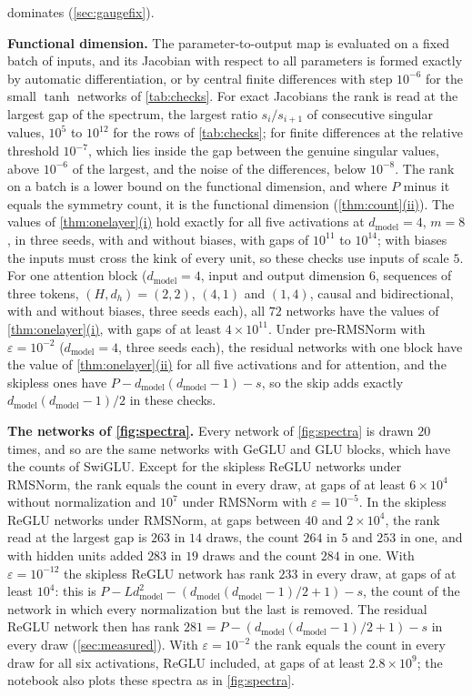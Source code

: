 \documentclass[10pt]{article}
\theoremstyle{definition}
\theoremstyle{remark}
\newcommand{\dm}{d_{\mathrm{model}}}
\newcommand{\para}[1]{\smallskip\noindent\textbf{#1}\hspace{0.5em}}
\DeclareRobustCommand{\cpref}[2]{\hyperref[#1:#2]{\cref*{#1}(#2)}}
\begin{document}
dominates (\cref{sec:gaugefix}).

\para{Functional dimension.} The parameter-to-output map is evaluated on a fixed batch of inputs, and its Jacobian with respect to all parameters is formed exactly by automatic differentiation, or by central finite differences with step $10^{-6}$ for the small $\tanh$ networks of \cref{tab:checks}. For exact Jacobians the rank is read at the largest gap of the spectrum, the largest ratio $s_i/s_{i+1}$ of consecutive singular values, $10^5$ to $10^{12}$ for the rows of \cref{tab:checks}; for finite differences at the relative threshold $10^{-7}$, which lies inside the gap between the genuine singular values, above $10^{-6}$ of the largest, and the noise of the differences, below $10^{-8}$. The rank on a batch is a lower bound on the functional dimension, and where $P$ minus it equals the symmetry count, it is the functional dimension (\cpref{thm:count}{ii}). The values of \cpref{thm:onelayer}{i} hold exactly for all five activations at $\dm = 4$, $m = 8$, in three seeds, with and without biases, with gaps of $10^{11}$ to $10^{14}$; with biases the inputs must cross the kink of every unit, so these checks use inputs of scale $5$. For one attention block ($\dm = 4$, input and output dimension $6$, sequences of three tokens, $(H, d_h) = (2, 2)$, $(4, 1)$ and $(1, 4)$, causal and bidirectional, with and without biases, three seeds each), all $72$ networks have the values of \cpref{thm:onelayer}{i}, with gaps of at least $4\times10^{11}$. Under pre-RMSNorm with $\varepsilon = 10^{-2}$ ($\dm = 4$, three seeds each), the residual networks with one block have the value of \cpref{thm:onelayer}{ii} for all five activations and for attention, and the skipless ones have $P - \dm(\dm-1) - s$, so the skip adds exactly $\dm(\dm-1)/2$ in these checks.

\para{The networks of \cref{fig:spectra}.} Every network of \cref{fig:spectra} is drawn $20$ times, and so are the same networks with GeGLU and GLU blocks, which have the counts of SwiGLU. Except for the skipless ReGLU networks under RMSNorm, the rank equals the count in every draw, at gaps of at least $6\times10^{4}$ without normalization and $10^{7}$ under RMSNorm with $\varepsilon = 10^{-5}$. In the skipless ReGLU networks under RMSNorm, at gaps between $40$ and $2\times10^{4}$, the rank read at the largest gap is $263$ in $14$ draws, the count $264$ in $5$ and $253$ in one, and with hidden units added $283$ in $19$ draws and the count $284$ in one. With $\varepsilon = 10^{-12}$ the skipless ReGLU network has rank $233$ in every draw, at gaps of at least $10^4$: this is $P - L\dm^2 - (\dm(\dm-1)/2 + 1) - s$, the count of the network in which every normalization but the last is removed. The residual ReGLU network then has rank $281 = P - (\dm(\dm-1)/2 + 1) - s$ in every draw (\cref{sec:measured}). With $\varepsilon = 10^{-2}$ the rank equals the count in every draw for all six activations, ReGLU included, at gaps of at least $2.8\times10^{9}$; the notebook also plots these spectra as in \cref{fig:spectra}.
\end{document}
